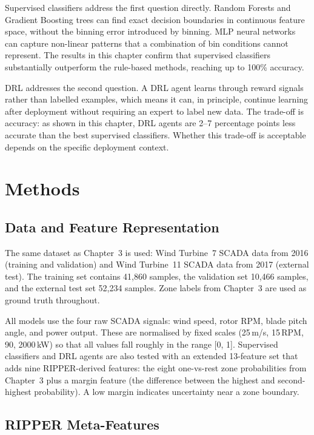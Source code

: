 Supervised classifiers address the first question directly. Random Forests and Gradient
Boosting trees can find exact decision boundaries in continuous feature space, without the
binning error introduced by binning. MLP neural networks can capture non-linear
patterns that a combination of bin conditions cannot represent. The results in this
chapter confirm that supervised classifiers substantially outperform the rule-based
methods, reaching up to 100\% accuracy.

DRL addresses the second question. A DRL agent learns through reward signals rather than
labelled examples, which means it can, in principle, continue learning after deployment
without requiring an expert to label new data. The trade-off is accuracy: as shown in
this chapter, DRL agents are 2--7 percentage points less accurate than the best
supervised classifiers. Whether this trade-off is acceptable depends on the specific
deployment context.

\section{Methods}
\label{sec:ch4:methods}

\subsection{Data and Feature Representation}
\label{subsec:ch4:data}

The same dataset as Chapter~3 is used: Wind Turbine~7 SCADA data from 2016 (training
and validation) and Wind Turbine~11 SCADA data from 2017 (external test). The training
set contains 41,860 samples, the validation set 10,466 samples, and the external test
set 52,234 samples. Zone labels from Chapter~3 are used as ground truth throughout.

All models use the four raw SCADA signals: wind speed, rotor RPM, blade pitch angle, and
power output. These are normalised by fixed scales (25\,m/s, 15\,RPM, 90\textdegree,
2000\,kW) so that all values fall roughly in the range [0, 1]. Supervised classifiers
and DRL agents are also tested with an extended 13-feature set that adds nine
RIPPER-derived features: the eight one-vs-rest zone probabilities from Chapter~3 plus a
margin feature (the difference between the highest and second-highest probability). A
low margin indicates uncertainty near a zone boundary.

\subsection{RIPPER Meta-Features}
\label{subsec:ch4:metafeatures}

